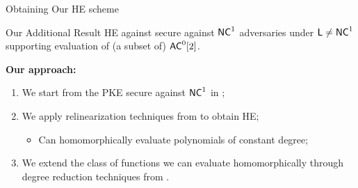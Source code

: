 \begin{frame}[t]{Obtaining Our HE scheme}
\begin{block}{Our Additional Result}
	HE against secure against ${\mathsf{NC}}^1$ adversaries under ${\mathsf{L}} \not = {\mathsf{NC}}^1$ supporting evaluation of (a subset of) ${\mathsf{AC}}^0[2]$.
\end{block}
\pause
\bigskip
	\textbf{Our approach:}
	\begin{enumerate}[<+- | alert@+>]
		\item We start from the PKE secure against ${\mathsf{NC}}^1$ in \cite{fgcrypto};
		\item We apply relinearization techniques from \cite{fhe-lwe} to obtain HE;
		\begin{itemize}
			\item Can homomorphically evaluate polynomials of constant degree; 
		\end{itemize}
		\item We extend the class of functions we can evaluate homomorphically through degree reduction techniques from \cite{razborov1987lower}.
	\end{enumerate}%
\end{frame}
